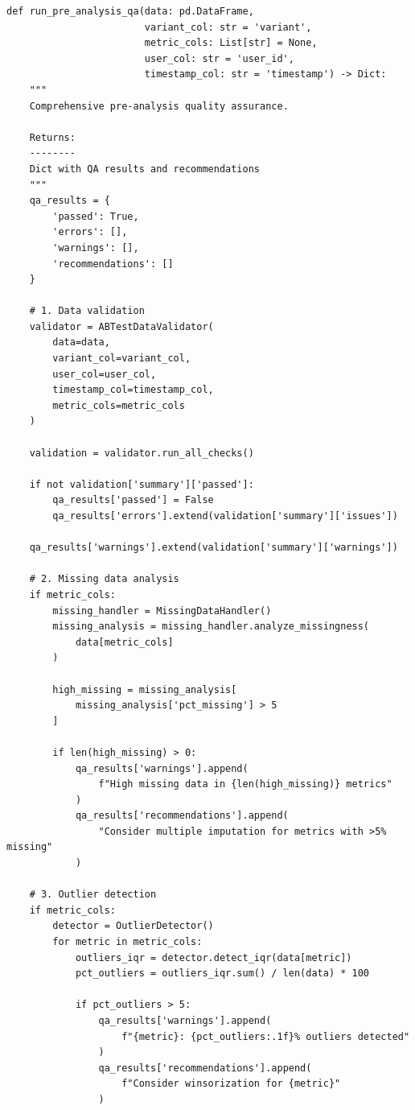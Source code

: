 \lstset{language=Python, caption=Pre-Analysis Quality Assurance}
\begin{lstlisting}
def run_pre_analysis_qa(data: pd.DataFrame,
                        variant_col: str = 'variant',
                        metric_cols: List[str] = None,
                        user_col: str = 'user_id',
                        timestamp_col: str = 'timestamp') -> Dict:
    """
    Comprehensive pre-analysis quality assurance.

    Returns:
    --------
    Dict with QA results and recommendations
    """
    qa_results = {
        'passed': True,
        'errors': [],
        'warnings': [],
        'recommendations': []
    }

    # 1. Data validation
    validator = ABTestDataValidator(
        data=data,
        variant_col=variant_col,
        user_col=user_col,
        timestamp_col=timestamp_col,
        metric_cols=metric_cols
    )

    validation = validator.run_all_checks()

    if not validation['summary']['passed']:
        qa_results['passed'] = False
        qa_results['errors'].extend(validation['summary']['issues'])

    qa_results['warnings'].extend(validation['summary']['warnings'])

    # 2. Missing data analysis
    if metric_cols:
        missing_handler = MissingDataHandler()
        missing_analysis = missing_handler.analyze_missingness(
            data[metric_cols]
        )

        high_missing = missing_analysis[
            missing_analysis['pct_missing'] > 5
        ]

        if len(high_missing) > 0:
            qa_results['warnings'].append(
                f"High missing data in {len(high_missing)} metrics"
            )
            qa_results['recommendations'].append(
                "Consider multiple imputation for metrics with >5% missing"
            )

    # 3. Outlier detection
    if metric_cols:
        detector = OutlierDetector()
        for metric in metric_cols:
            outliers_iqr = detector.detect_iqr(data[metric])
            pct_outliers = outliers_iqr.sum() / len(data) * 100

            if pct_outliers > 5:
                qa_results['warnings'].append(
                    f"{metric}: {pct_outliers:.1f}% outliers detected"
                )
                qa_results['recommendations'].append(
                    f"Consider winsorization for {metric}"
                )


\end{lstlisting}
